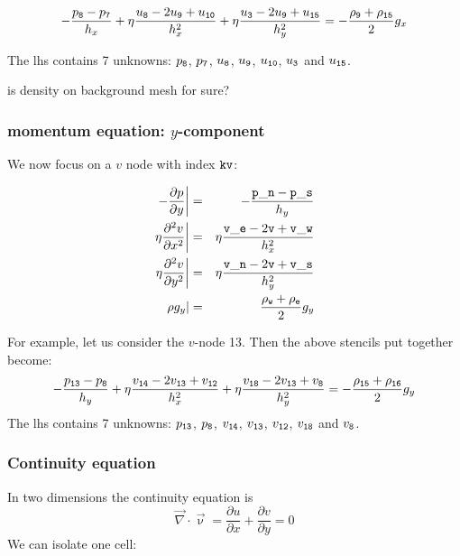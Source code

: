 \[
-\frac{p_{\tt 8}-p_{\tt 7}}{h_x}       
+
\eta \frac{u_{\tt 8} -2u_{\tt 9}+u_{\tt 10}}{h_x^2}  
+ 
\eta \frac{u_{\tt 3}-2u_{\tt 9}+u_{\tt 15}}{h_y^2}  
= -
\frac{\rho_{\tt 9} + \rho_{\tt 15}}{2} g_x  
\]

The lhs contains 7 unknowns: $p_{\tt 8}$, $p_{\tt 7}$, $u_{\tt 8}$,
$u_{\tt 9}$, $u_{\tt 10}$, $u_{\tt 3}$ and $u_{\tt 15}$.

{\color{red} is density on background mesh for sure?}


\subsubsection{momentum equation: $y$-component}

We now focus on a $v$ node with index ${\tt kv}$:




\begin{eqnarray}
\left. -\frac{\partial p}{\partial y} \right|
&=& -\frac{{\tt p\_n}-{\tt p\_s}}{h_y}       \nonumber\\
\left. \eta \frac{\partial^2 v}{\partial x^2} \right|
&=& \eta \frac{{\tt v\_e} -2{\tt v}+{\tt v\_w}}{h_x^2}  \nonumber\\
\left. \eta \frac{\partial^2 v}{\partial y^2} \right|
&=& \eta \frac{{\tt v\_n} -2{\tt v}+{\tt v\_s}}{h_y^2}  \nonumber\\
\left. \rho g_y \right| 
&=& \frac{\rho_{\tt w} + \rho_{\tt e}}{2} g_y   \nonumber
\end{eqnarray}

For example, let us consider the $v$-node 13. Then the above stencils put together become:
\[
 -\frac{p_{\tt 13}-p_{\tt 8}}{h_y}       
+
\eta \frac{v_{\tt 14} -2v_{\tt 13}+v_{\tt 12}}{h_x^2} 
+
\eta \frac{v_{\tt 18} -2v_{\tt 13}+v_{\tt 8}}{h_y^2}  
= -
\frac{\rho_{\tt 15} + \rho_{\tt 16}}{2} g_y  
\]
The lhs contains 7 unknowns: $p_{\tt 13}$, $p_{\tt 8}$, $v_{\tt 14}$,
$v_{\tt 13}$, $v_{\tt 12}$, $v_{\tt 18}$ and $v_{\tt 8}$.



\subsubsection{Continuity equation}

In two dimensions the continuity equation
is 
\[
\vec\nabla \cdot \vec\upnu 
= 
\frac{\partial u}{\partial x} 
+
\frac{\partial v}{\partial y} 
=0
\]
We can isolate one cell:

